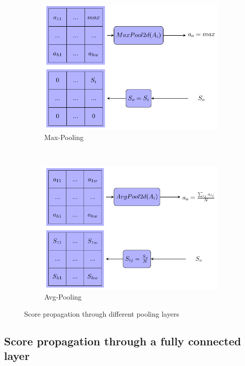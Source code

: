 \documentclass[review]{elsarticle}
\theoremstyle{definition} %
\theoremstyle{remark}
\begin{document}
\begin{figure}[!ht]
	\centering
	\begin{subfigure}{0.48\textwidth}
		\includegraphics[scale=0.55]{./figures/score_maxpool.pdf}
		\caption{Max-Pooling}
	\end{subfigure}
	~ %
	\begin{subfigure}{0.48\textwidth}
		\includegraphics[scale=0.55]{./figures/score_avgpool.pdf}
		\caption{Avg-Pooling}
	\end{subfigure}
	\caption{Score propagation through different pooling layers}
	\label{fig:score_pooling}
\end{figure}

\subsection{Score propagation through a fully connected layer} 
\end{document}
